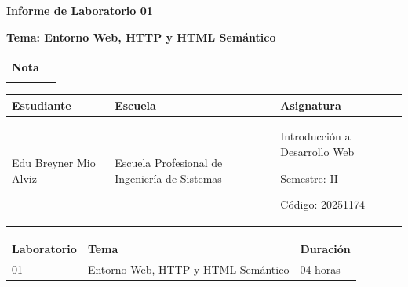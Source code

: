 \documentclass{article}
\newcommand{\itemEmail}{}
\newcommand{\itemStudent}{Edu Breyner Mio Alviz }
\newcommand{\itemCourse}{Introducción al Desarrollo Web}
\newcommand{\itemCourseCode}{20251174}
\newcommand{\itemSemester}{II}
\newcommand{\itemSchool}{Escuela Profesional de Ingeniería de Sistemas}
\newcommand{\itemPracticeNumber}{01}
\newcommand{\itemTheme}{Entorno Web, HTTP y HTML Semántico}
\begin{document}
\vspace*{10px}


\begin{center}
    \fontsize{17}{17}
    \textbf{Informe de Laboratorio \itemPracticeNumber}
\end{center}

\centerline{\textbf{\Large Tema: \itemTheme}}

\vspace{0.3cm}


\begin{flushright}
    \begin{tabular}{|M{2.5cm}|N|}
        \hline
        \color{white}\textbf{Nota} \\
        \hline
        \\[30pt]
        \hline
    \end{tabular}
\end{flushright}


\begin{table}[h!]
    \begin{tabular}{|x{4.7cm}|x{4.8cm}|x{4.8cm}|}
        \hline
        \color{white}\textbf{Estudiante}
        &
        \color{white}\textbf{Escuela}
        &
        \color{white}\textbf{Asignatura}
        \\
        \hline

        {\itemStudent \par \itemEmail}
        &
        \itemSchool
        &
        {\itemCourse \par Semestre: \itemSemester \par Código: \itemCourseCode}

        \\
        \hline
    \end{tabular}
\end{table}


\begin{table}[H]
    \begin{tabular}{|x{4.7cm}|x{4.8cm}|x{4.8cm}|}
        \hline
        \color{white}\textbf{Laboratorio}
        &
        \color{white}\textbf{Tema}
        &
        \color{white}\textbf{Duración}
        \\
        \hline

        \itemPracticeNumber
        &
        \itemTheme
        &
        04 horas

        \\
        \hline
    \end{tabular}
\end{table}
\end{document}
